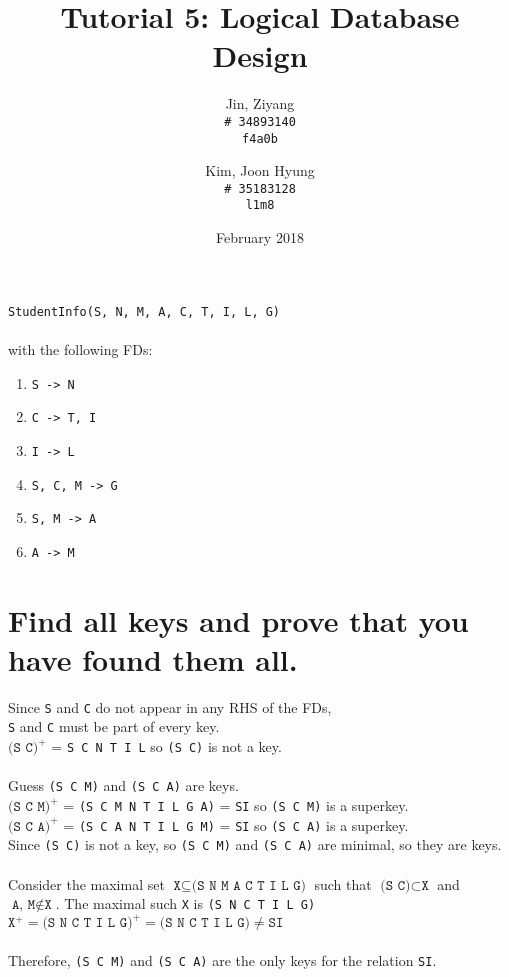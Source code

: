 \documentclass{article}
\title{Tutorial 5: Logical Database Design}
\author{
	Jin, Ziyang\\
	\texttt{\# 34893140}\\
	\texttt{f4a0b}
	\and
	Kim, Joon Hyung\\
	\texttt{\# 35183128}\\
	\texttt{l1m8}
}
\date{February 2018}
\begin{document}
	\maketitle
	\texttt{StudentInfo(S, N, M, A, C, T, I, L, G)}\\
	\\
	with the following FDs:
	\begin{enumerate}
		\item \texttt{S -> N}
		\item \texttt{C -> T, I}
		\item \texttt{I -> L}
		\item \texttt{S, C, M -> G}
		\item \texttt{S, M -> A}
		\item \texttt{A -> M}
	\end{enumerate}
	
\section{Find all keys and prove that you have found them all.}

Since \texttt{S} and \texttt{C} do not appear in any RHS of the FDs, \\
\texttt{S} and \texttt{C} must be part of every key. \\
\( \texttt{(S C)}^+ \) = \texttt{S C N T I L} so \texttt{(S C)} is not a key.\\
\\
Guess \texttt{(S C M)} and \texttt{(S C A)} are keys. \\
\( \texttt{(S C M)}^+ \) = \texttt{(S C M N T I L G A)} = \texttt{SI} so \texttt{(S C M)} is a superkey.\\
\( \texttt{(S C A)}^+ \) = \texttt{(S C A N T I L G M)} = \texttt{SI} so \texttt{(S C A)} is a superkey.\\
Since \texttt{(S C)} is not a key, so \texttt{(S C M)} and \texttt{(S C A)} are minimal, so they are keys. \\
\\
Consider the maximal set \( \texttt{X}  \subseteq \texttt{(S N M A C T I L G)} \) such that \( \texttt{(S C)} \subset \texttt{X}\) and \( \texttt{A, M} \notin \texttt{X} \). The maximal such \texttt{X} is \texttt{(S N C T I L G)} \\
\( \texttt{X}^+ = \texttt{(S N C T I L G)}^+ = \texttt{(S N C T I L G)} \neq \texttt{SI} \)\\
\\
Therefore, \texttt{(S C M)} and \texttt{(S C A)} are the only keys for the relation \texttt{SI}.\\
\end{document}
